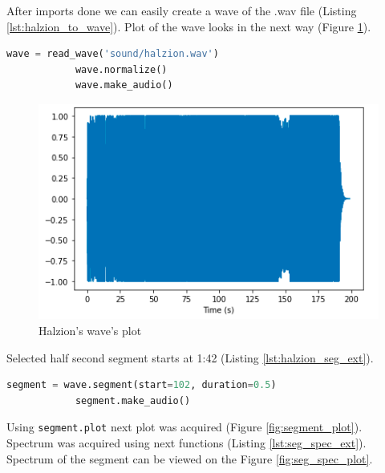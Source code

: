 \documentclass[a4paper]{article}
\begin{document}
        After imports done we can easily create a wave of the .wav file (Listing \ref{lst:halzion_to_wave}). Plot of the wave looks in the next way (Figure \ref{fig:halzion_wave_plot}).
            
        \begin{lstlisting}[language=Python,caption=Wav file conversion to wave instance,label={lst:halzion_to_wave}]
            wave = read_wave('sound/halzion.wav')
            wave.normalize()
            wave.make_audio()
        \end{lstlisting}

        \begin{figure}[H]
          \centering
          \includegraphics[width=\textwidth]{img/halzion_wave.png}
          \caption{Halzion's wave's plot}
          \label{fig:halzion_wave_plot}
        \end{figure}
            
        Selected half second segment starts at 1:42 (Listing \ref{lst:halzion_seg_ext}).
            
        \begin{lstlisting}[language=Python,caption=Segment extraction,label={lst:halzion_seg_ext}]
            segment = wave.segment(start=102, duration=0.5)
            segment.make_audio()
        \end{lstlisting}

        Using \texttt{segment.plot} next plot was acquired (Figure \ref{fig:segment_plot}). Spectrum was acquired using next functions (Listing \ref{lst:seg_spec_ext}). Spectrum of the segment can be viewed on the Figure \ref{fig:seg_spec_plot}.
            
\end{document}
